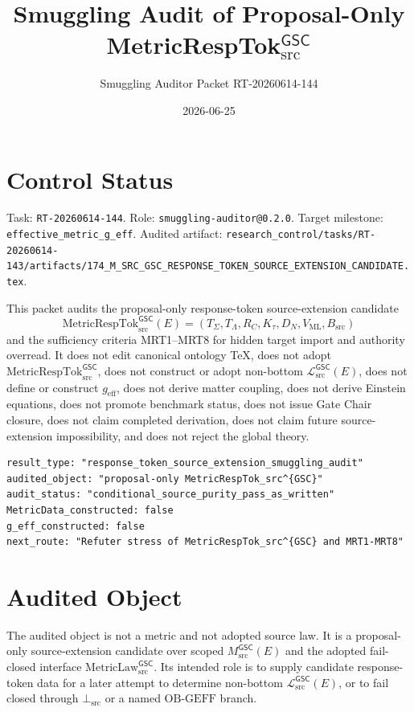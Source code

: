 \documentclass[11pt]{article}
\title{Smuggling Audit of Proposal-Only MetricRespTok\(_{\mathrm{src}}^{\mathsf{GSC}}\)}
\author{Smuggling Auditor Packet RT-20260614-144}
\date{2026-06-25}
\newcommand{\MsrcGSC}{M_{\mathrm{src}}^{\mathsf{GSC}}}
\newcommand{\MetricLaw}{\mathrm{MetricLaw}_{\mathrm{src}}^{\mathsf{GSC}}}
\newcommand{\MetricRespTok}{\mathrm{MetricRespTok}_{\mathrm{src}}^{\mathsf{GSC}}}
\newcommand{\MetricData}{\mathcal{L}_{\mathrm{src}}^{\mathsf{GSC}}}
\newcommand{\BottomSrc}{\bot_{\mathrm{src}}}
\newcommand{\OBGEFF}{\mathrm{OB\mbox{-}GEFF}}
\newcommand{\geff}{g_{\mathrm{eff}}}
\begin{document}
\maketitle

\section{Control Status}

Task: \texttt{RT-20260614-144}. Role:
\texttt{smuggling-auditor@0.2.0}. Target milestone:
\texttt{effective\_metric\_g\_eff}. Audited artifact:
\texttt{research\_control/tasks/RT-20260614-143/artifacts/174\_M\_SRC\_GSC\_RESPONSE\_TOKEN\_SOURCE\_EXTENSION\_CANDIDATE.tex}.

This packet audits the proposal-only response-token source-extension
candidate
\[
  \MetricRespTok(E)
  =
  (
    T_{\Sigma},
    T_{\Lambda},
    R_C,
    K_{\tau},
    D_N,
    V_{\mathrm{ML}},
    B_{\mathrm{src}}
  )
\]
and the sufficiency criteria MRT1--MRT8 for hidden target import and
authority overread. It does not edit canonical ontology TeX, does not adopt
\(\MetricRespTok\), does not construct or adopt non-bottom \(\MetricData(E)\),
does not define or construct \(\geff\), does not derive matter coupling, does
not derive Einstein equations, does not promote benchmark status, does not
issue Gate Chair closure, does not claim completed derivation, does not claim
future source-extension impossibility, and does not reject the global theory.

\begin{verbatim}
result_type: "response_token_source_extension_smuggling_audit"
audited_object: "proposal-only MetricRespTok_src^{GSC}"
audit_status: "conditional_source_purity_pass_as_written"
MetricData_constructed: false
g_eff_constructed: false
next_route: "Refuter stress of MetricRespTok_src^{GSC} and MRT1-MRT8"
\end{verbatim}

\section{Audited Object}

The audited object is not a metric and not adopted source law. It is a
proposal-only source-extension candidate over scoped \(\MsrcGSC(E)\) and the
adopted fail-closed interface \(\MetricLaw\). Its intended role is to supply
candidate response-token data for a later attempt to determine non-bottom
\(\MetricData(E)\), or to fail closed through \(\BottomSrc\) or a named
\(\OBGEFF\) branch.
\end{document}
